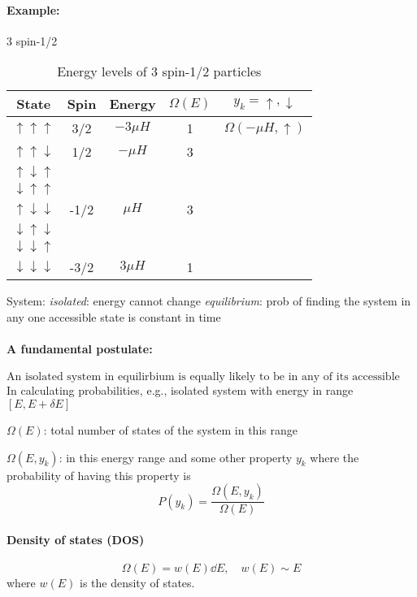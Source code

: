\documentclass[../main.tex]{subfiles}
\begin{document}
\paragraph*{Example:} 3 spin-1/2
\begin{table} [ht]
    \centering
    \begin{tabular}{c|c|c|c|c}
        State & Spin & Energy & $\Omega(E)$ & $y_k = \uparrow, \downarrow$ \\
        \hline
        $\uparrow\uparrow\uparrow$ & 3/2 & $-3\mu H$ & 1 & $\Omega(-\mu H, \uparrow)$ \\
        $\uparrow\uparrow\downarrow$ & 1/2 & $-\mu H$ & 3 \\
        $\uparrow\downarrow\uparrow$ & & & \\
        $\downarrow\uparrow\uparrow$ & & & \\
        $\uparrow\downarrow\downarrow$ & -1/2 & $\mu H$ & 3 \\
        $\downarrow\uparrow\downarrow$ & & & \\
        $\downarrow\downarrow\uparrow$ & & & \\
        $\downarrow\downarrow\downarrow$ & -3/2 & $3\mu H$ & 1
    \end{tabular}
    \caption{Energy levels of 3 spin-1/2 particles}
    \label{tab:3spin}
\end{table}

System: \emph{isolated}: energy cannot change
\emph{equilibrium}: prob of finding the system in any one accessible state is constant in time

\paragraph*{A fundamental postulate:}
\[\boxed{\textrm{An isolated system in equilirbium is equally likely to be in any of its accessible states}}\]
In calculating probabilities, e.g., isolated system with energy in range $[E, E+\delta E]$

$\Omega(E)$: total number of states of the system in this range

$\Omega(E,y_k)$: in this energy range and some other property $y_k$
where the probability of having this property is
\[P(y_k) = \frac{\Omega(E,y_k)}{\Omega(E)}\]

\paragraph*{Density of states (DOS)}
\[\Omega(E) = w(E) \dd E, \quad w(E) \sim E\]
where $w(E)$ is the density of states.
\end{document}
